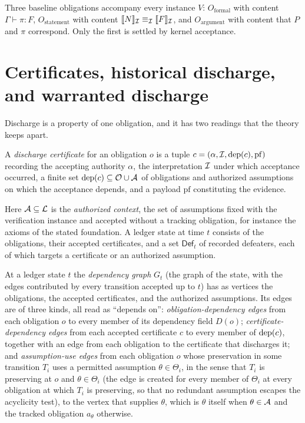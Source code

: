 Three baseline obligations accompany every instance $V$: $O_{\mathrm{formal}}$ with content $\Gamma \vdash \pi : F$, $O_{\mathrm{statement}}$ with content $\llbracket N\rrbracket_{\mathcal{I}} \equiv_{\mathcal{I}} \llbracket F\rrbracket_{\mathcal{I}}$, and $O_{\mathrm{argument}}$ with content that $P$ and $\pi$ correspond. Only the first is settled by kernel acceptance.

\section{Certificates, historical discharge, and warranted discharge}

Discharge is a property of one obligation, and it has two readings that the theory keeps apart.

\begin{definition}
A \emph{discharge certificate} for an obligation $o$ is a tuple $c = (\alpha, \mathcal{I}, \mathrm{dep}(c), \mathrm{pf})$ recording the accepting authority $\alpha$, the interpretation $\mathcal{I}$ under which acceptance occurred, a finite set $\operatorname{dep}(c) \subseteq \mathcal{O} \cup \mathcal{A}$ of obligations and authorized assumptions on which the acceptance depends, and a payload $\mathrm{pf}$ constituting the evidence.
\end{definition}

Here $\mathcal{A} \subseteq \mathcal{L}$ is the \emph{authorized context}, the set of assumptions fixed with the verification instance and accepted without a tracking obligation, for instance the axioms of the stated foundation. A ledger state at time $t$ consists of the obligations, their accepted certificates, and a set $\mathsf{Def}_t$ of recorded defeaters, each of which targets a certificate or an authorized assumption.

\begin{definition}
\label{def:depgraph}
At a ledger state $t$ the \emph{dependency graph} $G_t$ (the graph of the state, with the edges contributed by every transition accepted up to $t$) has as vertices the obligations, the accepted certificates, and the authorized assumptions. Its edges are of three kinds, all read as ``depends on'': \emph{obligation-dependency edges} from each obligation $o$ to every member of its dependency field $D(o)$; \emph{certificate-dependency edges} from each accepted certificate $c$ to every member of $\operatorname{dep}(c)$, together with an edge from each obligation to the certificate that discharges it; and \emph{assumption-use edges} from each obligation $o$ whose preservation in some transition $T_i$ uses a permitted assumption $\theta \in \Theta_i$, in the sense that $T_i$ is preserving at $o$ and $\theta \in \Theta_i$ (the edge is created for every member of $\Theta_i$ at every obligation at which $T_i$ is preserving, so that no redundant assumption escapes the acyclicity test), to the vertex that supplies $\theta$, which is $\theta$ itself when $\theta \in \mathcal{A}$ and the tracked obligation $a_\theta$ otherwise.
\end{definition}

